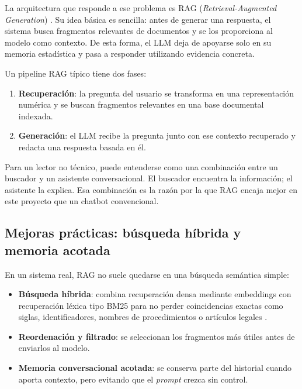 La arquitectura que responde a ese problema es RAG (\textit{Retrieval-Augmented Generation}) \cite{lewis2020rag}. Su idea básica es sencilla: antes de generar una respuesta, el sistema busca fragmentos relevantes de documentos y se los proporciona al modelo como contexto. De esta forma, el LLM deja de apoyarse solo en su memoria estadística y pasa a responder utilizando evidencia concreta.

Un pipeline RAG típico tiene dos fases:

\begin{enumerate}
    \item \textbf{Recuperación}: la pregunta del usuario se transforma en una representación numérica y se buscan fragmentos relevantes en una base documental indexada.
    \item \textbf{Generación}: el LLM recibe la pregunta junto con ese contexto recuperado y redacta una respuesta basada en él.
\end{enumerate}

Para un lector no técnico, puede entenderse como una combinación entre un buscador y un asistente conversacional. El buscador encuentra la información; el asistente la explica. Esa combinación es la razón por la que RAG encaja mejor en este proyecto que un chatbot convencional.

\subsection{Mejoras prácticas: búsqueda híbrida y memoria acotada}

En un sistema real, RAG no suele quedarse en una búsqueda semántica simple:

\begin{itemize}
    \item \textbf{Búsqueda híbrida}: combina recuperación densa mediante embeddings con recuperación léxica tipo BM25 para no perder coincidencias exactas como siglas, identificadores, nombres de procedimientos o artículos legales \cite{robertson2009bm25,weaviateHybridDocs,qdrantHybridTutorial}.
    \item \textbf{Reordenación y filtrado}: se seleccionan los fragmentos más útiles antes de enviarlos al modelo.
    \item \textbf{Memoria conversacional acotada}: se conserva parte del historial cuando aporta contexto, pero evitando que el \textit{prompt} crezca sin control.
\end{itemize}

